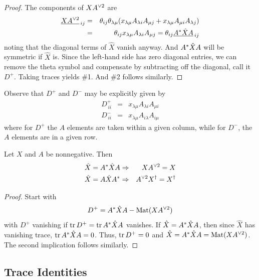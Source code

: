 \begin{proof} The components of $X{A}^{\vee 2}$ are
%
\begin{eqnarray*}
\underline{X{A}^{\vee 2}}_{\,ij}  
  &=& \theta_{ij}\theta_{\lambda\mu}
	(x_{\lambda\mu}A_{\lambda i}A_{\mu j}
	+x_{\lambda\mu}A_{\mu i}A_{\lambda j}) \\
  &=& \theta_{ij} x_{\lambda\mu} A_{\lambda i}A_{\mu j}
	=\theta_{ij}\underline{{A}^*{\hat X}{A}}_{\,ij}
\end{eqnarray*}
%
noting that the diagonal terms of $\hat X$ vanish anyway. And ${A}^*{\hat X}{A}$ will be symmetric if $\hat X$ is.
Since the left-hand side has zero diagonal entries, we can remove the theta symbol and compensate by subtracting off
the diagonal, call it $D^+$. 
Taking traces yields \#1. And \#2 follows similarly.
\end{proof}

\begin{remark}   	\label{rem:7.1}
Observe that $D^+$ and $D^-$ may be explicitly given by
%
\begin{eqnarray*}
  D^+_{\,ii}  &=& x_{\lambda\mu}A_{\lambda i}A_{\mu i} \\
  D^-_{\,ii}  &=& x_{\lambda\mu}A_{i\lambda }A_{i\mu} 
\end{eqnarray*}
%
where for $D^+$ the $A$ elements are taken within a given column, while for $D^-$, the $A$ elements are in a given row.
\end{remark}

\begin{proposition}\label{propXX}  	\label{prop:7.2} %
Let $X$ and $A$ be nonnegative. Then 
%
\begin{eqnarray*}
  \hat X = \symm{A}{\hat X}  &\Rightarrow&  X\spow{A}{2} = X\\
  \hat X = \sym{A}{\hat X}  &\Rightarrow&  \spow{A}{2}\dg  X. = \dg  X.
\end{eqnarray*}
%
\end{proposition}

\begin{proof} Start with
$$
  D^+= {A}^*{\hat X}{A}-{\rm Mat}(X{A}^{\vee 2})
$$
with $D^+$ vanishing if ${\rm tr}\, D^+={\rm tr}\, {A}^*{\hat X}{A}$ vanishes.
If $\hat X = {A}^*{\hat X}{A}$, then since $\hat X$ has vanishing trace, ${\rm tr}\, {A}^*{\hat X}{A}=0$. 
Thus, ${\rm tr}\, D^+=0$ and $\hat X = {A}^*{\hat X}{A}={\rm Mat}(X{A}^{\vee 2})$. 
The second implication follows similarly. 
\end{proof}

\subsection{Trace Identities}
\label{sec:7.1.3}

